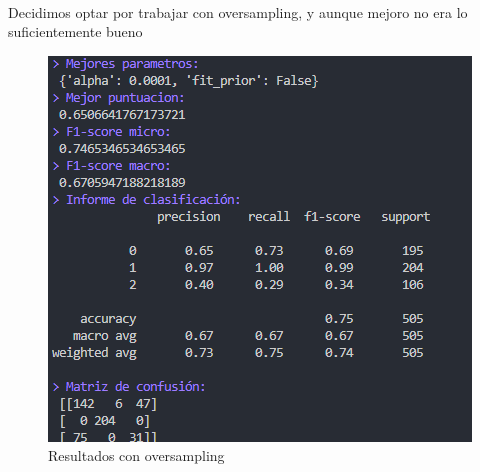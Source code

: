 \documentclass{report}
\begin{document}
                \paragraph*{}{
                    Decidimos optar por trabajar con oversampling, y aunque mejoro no era lo suficientemente bueno \color{orange}{Puntuacion media:}
                }
                \begin{figure}[H]
                    \centering
                    \includegraphics[width=\textwidth]{img/oversampling.png}
                    \caption{Resultados con oversampling}
                \end{figure}
\end{document}
